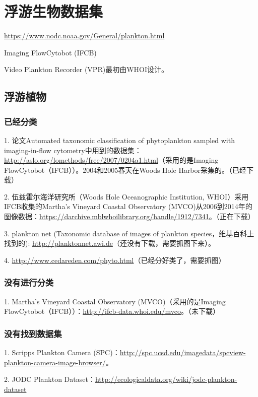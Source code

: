 \section{浮游生物数据集}
\url{https://www.nodc.noaa.gov/General/plankton.html}

Imaging FlowCytobot (IFCB)

Video Plankton Recorder (VPR)最初由WHOI设计。


\subsection{浮游植物}

\subsubsection{已经分类}
1. 论文Automated taxonomic classification of phytoplankton sampled with imaging-in-flow cytometry中用到的数据集：\url{http://aslo.org/lomethods/free/2007/0204a1.html}（采用的是Imaging FlowCytobot（IFCB））。2004和2005春天在Woods Hole Harbor采集的。（已经下载）

2. 伍兹霍尔海洋研究所（Woods Hole Oceanographic Institution, WHOI）采用IFCB收集的Martha's Vineyard Coastal Observatory (MVCO)从2006到2014年的图像数据：\url{https://darchive.mblwhoilibrary.org/handle/1912/7341}。（正在下载）

3. plankton net (Taxonomic database of images of plankton species，维基百科上找到的): \url{http://planktonnet.awi.de}（还没有下载，需要抓图下来）。

4. \url{http://www.cedareden.com/phyto.html}（已经分好类了，需要抓图）



\subsubsection{没有进行分类}
1. Martha’s Vineyard Coastal Observatory (MVCO)（采用的是Imaging FlowCytobot（IFCB））：\url{http://ifcb-data.whoi.edu/mvco}。（未下载）



\subsubsection{没有找到数据集}
1. Scripps Plankton Camera (SPC)：\url{http://spc.ucsd.edu/imagedata/spcview-plankton-camera-image-browser/}。

2. JODC Plankton Dataset：\url{http://ecologicaldata.org/wiki/jodc-plankton-dataset}

